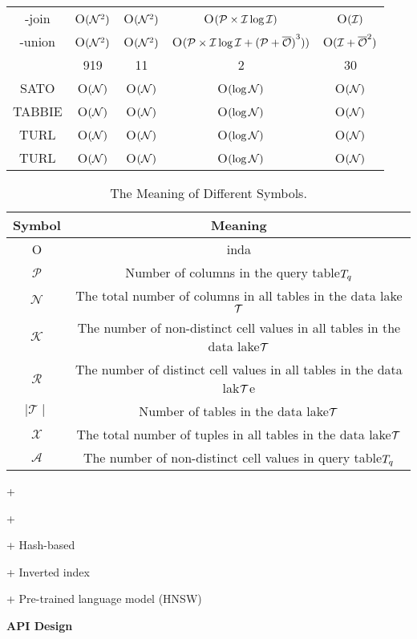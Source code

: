 \begin{table*}[t]
{\begin{tabular}{c||cc|cc}
			\infogather-join        & O$(\mathcal{N}^2)$         & O$(\mathcal{N}^2)$     & O$(\mathcal{P} \times \mathcal{I} \log \mathcal{I})$              & O$(\mathcal{I})$      \\
			\infogather-union        & O$(\mathcal{N}^2)$          & O$(\mathcal{N}^2)$    & O$(\mathcal{P} \times \mathcal{I} \log \mathcal{I} + {(\mathcal{P} + \overline{\mathcal{O}})}^3))$              & O$(\mathcal{I} + {\overline{\mathcal{O}}}^2)$      \\
			\aurum            & 919            & 11                   & 2                & 30       \\
			SATO            & O$(\mathcal{N})$         & O$(\mathcal{N})$                   & O$(\log \mathcal{N})$                & O$(\mathcal{N})$    \\
			TABBIE         & O$(\mathcal{N})$         & O$(\mathcal{N})$                   & O$(\log \mathcal{N})$                & O$(\mathcal{N})$    \\
			TURL         & O$(\mathcal{N})$         & O$(\mathcal{N})$                   & O$(\log \mathcal{N})$                & O$(\mathcal{N})$    \\
			TURL         & O$(\mathcal{N})$         & O$(\mathcal{N})$                   & O$(\log \mathcal{N})$                & O$(\mathcal{N})$    \\
			\bottomrule
		\end{tabular}
	}
	\vspace{-1em}
	\label{table:complex_analyse}
	\end{table*}

\begin{table*}[!ht]
	\centering
	\caption{The Meaning of Different Symbols.}
	\begin{tabular}{cc}
		\hline
		Symbol & Meaning \\ \hline
		O & inda \\ 
		$\mathcal{P}$ & Number of columns in the query table$T_q$  \\
		$\mathcal{N}$ &The total number of columns in all tables in the data lake$\mathcal{T}$ \\
		$\mathcal{K}$ & The number of non-distinct cell values in all tables in the data lake$\mathcal{T}$   \\
		$\mathcal{R}$ &The number of distinct cell values in all tables in the data lak$\mathcal{T}$e \\
		$\mid \mathcal{T} \mid$ & Number of tables in the data lake$\mathcal{T}$  \\
		$\mathcal{X}$ &The total number of tuples in all tables in the data lake$\mathcal{T}$ \\
		$\mathcal{A}$ & The number of non-distinct cell values in query table$T_q$  \\
	
		

	
	\end{tabular}
	\label{symbol_table}
\end{table*}

+ 

+ 

+ Hash-based

+ Inverted index 

+ Pre-trained language model (HNSW)


\noindent\textbf{API Design}

